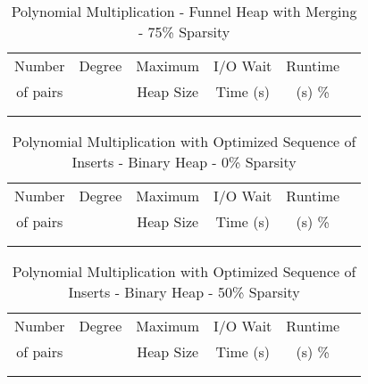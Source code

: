 \documentclass[11pt, one-sided]{amsart}
\begin{document}
\begin{table}[htbp]
   \centering
      \caption{Polynomial Multiplication - Funnel Heap with Merging - 75\% Sparsity}
   \begin{tabular}{|c|c|c|c|c|c|}
   	\hline
		 Number   & 	Degree	& Maximum & I/O Wait		& Runtime 	 \\ 
		 of pairs 	&			& Heap Size	& Time (s)		&	(s)		 		\%				\\ \hline
		 		&			&			&			&						\\
		 		&			&			&			&						\\
   \end{tabular}
   \label{tab:booktabs}
\end{table}


\newpage




\begin{table}[htbp]
   \centering
      \caption{Polynomial Multiplication with Optimized Sequence of Inserts - Binary Heap - 0\% Sparsity}
   \begin{tabular}{|c|c|c|c|c|c|}
   	\hline
		 Number   & 	Degree	& Maximum & I/O Wait		& Runtime 	 \\ 
		 of pairs 	&			& Heap Size	& Time (s)		&	(s)		 		\%				\\ \hline
		 		&			&			&			&						\\
		 		&			&			&			&						\\
   \end{tabular}
   \label{tab:booktabs}
\end{table}

\begin{table}[htbp]
   \centering
      \caption{Polynomial Multiplication with Optimized Sequence of Inserts - Binary Heap - 50\% Sparsity}
   \begin{tabular}{|c|c|c|c|c|c|}
   	\hline
		 Number   & 	Degree	& Maximum & I/O Wait		& Runtime 	 \\ 
		 of pairs 	&			& Heap Size	& Time (s)		&	(s)		 		\%				\\ \hline
		 		&			&			&			&						\\
		 		&			&			&			&						\\
   \end{tabular}
   \label{tab:booktabs}
\end{table}
\end{document}
